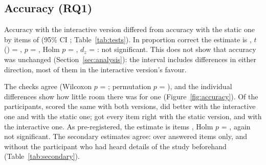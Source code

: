 \documentclass[10pt,twocolumn]{article}
\begin{document}
\begin{table}[t]
    \centering
    \footnotesize
    
    \caption{
        The pre-registered exclusions, in the order they run: the answers each removed in the main analysis and as pre-registered, with the participants or sessions it covers in brackets. The third and fourth remove only an answer's time, and only from the time analysis. A session logged through a database outage would be kept, and the time analysis run again without it.
    }
    \label{tab:exclusions}
\end{table}

\subsection{Accuracy (RQ1)}
\label{sec:accuracy}

Accuracy with the interactive version differed from accuracy with the static one by  items of  (95\% CI ; Table~\ref{tab:tests}). In proportion correct the estimate is  , $t$() = , $p$ = , Holm $p$ = , $d_z$ = : not significant. This does not show that accuracy was unchanged (Section~\ref{sec:analysis}): the interval includes differences in either direction, most of them in the interactive version's favour.

The checks agree (Wilcoxon $p$ = ; permutation $p$ = ), and the individual differences show how little room there was for one (Figure~\ref{fig:accuracy}). Of the  participants,  scored the same with both versions,  did better with the interactive one and  with the static one;  got every item right with the static version, and  with the interactive one. As pre-registered, the estimate is  items , Holm $p$ = , again not significant. The secondary estimates agree:  over answered items only, and  without the  participant who had heard details of the study beforehand (Table~\ref{tab:secondary}).
\end{document}

